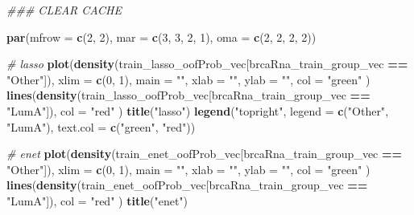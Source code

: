 \documentclass[
]{book}
\newenvironment{Shaded}{\begin{snugshade}}{\end{snugshade}}
\newcommand{\CommentTok}[1]{\textcolor[rgb]{0.56,0.35,0.01}{\textit{#1}}}
\newcommand{\DataTypeTok}[1]{\textcolor[rgb]{0.13,0.29,0.53}{#1}}
\newcommand{\DecValTok}[1]{\textcolor[rgb]{0.00,0.00,0.81}{#1}}
\newcommand{\KeywordTok}[1]{\textcolor[rgb]{0.13,0.29,0.53}{\textbf{#1}}}
\newcommand{\NormalTok}[1]{#1}
\newcommand{\OperatorTok}[1]{\textcolor[rgb]{0.81,0.36,0.00}{\textbf{#1}}}
\newcommand{\StringTok}[1]{\textcolor[rgb]{0.31,0.60,0.02}{#1}}
\begin{document}
\begin{Shaded}
\begin{Highlighting}[]
\CommentTok{\#\#\# CLEAR CACHE}

\KeywordTok{par}\NormalTok{(}\DataTypeTok{mfrow =} \KeywordTok{c}\NormalTok{(}\DecValTok{2}\NormalTok{, }\DecValTok{2}\NormalTok{), }\DataTypeTok{mar =} \KeywordTok{c}\NormalTok{(}\DecValTok{3}\NormalTok{, }\DecValTok{3}\NormalTok{, }\DecValTok{2}\NormalTok{, }\DecValTok{1}\NormalTok{), }\DataTypeTok{oma =} \KeywordTok{c}\NormalTok{(}\DecValTok{2}\NormalTok{, }\DecValTok{2}\NormalTok{, }\DecValTok{2}\NormalTok{, }\DecValTok{2}\NormalTok{))}

\CommentTok{\# lasso}
\KeywordTok{plot}\NormalTok{(}\KeywordTok{density}\NormalTok{(train\_lasso\_oofProb\_vec[brcaRna\_train\_group\_vec }\OperatorTok{==}\StringTok{ "Other"}\NormalTok{]),}
  \DataTypeTok{xlim =} \KeywordTok{c}\NormalTok{(}\DecValTok{0}\NormalTok{, }\DecValTok{1}\NormalTok{), }\DataTypeTok{main =} \StringTok{""}\NormalTok{, }\DataTypeTok{xlab =} \StringTok{""}\NormalTok{, }\DataTypeTok{ylab =} \StringTok{""}\NormalTok{, }\DataTypeTok{col =} \StringTok{"green"}
\NormalTok{)}
\KeywordTok{lines}\NormalTok{(}\KeywordTok{density}\NormalTok{(train\_lasso\_oofProb\_vec[brcaRna\_train\_group\_vec }\OperatorTok{==}\StringTok{ "LumA"}\NormalTok{]),}
  \DataTypeTok{col =} \StringTok{"red"}
\NormalTok{)}
\KeywordTok{title}\NormalTok{(}\StringTok{"lasso"}\NormalTok{)}
\KeywordTok{legend}\NormalTok{(}\StringTok{"topright"}\NormalTok{, }\DataTypeTok{legend =} \KeywordTok{c}\NormalTok{(}\StringTok{"Other"}\NormalTok{, }\StringTok{"LumA"}\NormalTok{), }\DataTypeTok{text.col =} \KeywordTok{c}\NormalTok{(}\StringTok{"green"}\NormalTok{, }\StringTok{"red"}\NormalTok{))}

\CommentTok{\# enet}
\KeywordTok{plot}\NormalTok{(}\KeywordTok{density}\NormalTok{(train\_enet\_oofProb\_vec[brcaRna\_train\_group\_vec }\OperatorTok{==}\StringTok{ "Other"}\NormalTok{]),}
  \DataTypeTok{xlim =} \KeywordTok{c}\NormalTok{(}\DecValTok{0}\NormalTok{, }\DecValTok{1}\NormalTok{), }\DataTypeTok{main =} \StringTok{""}\NormalTok{, }\DataTypeTok{xlab =} \StringTok{""}\NormalTok{, }\DataTypeTok{ylab =} \StringTok{""}\NormalTok{, }\DataTypeTok{col =} \StringTok{"green"}
\NormalTok{)}
\KeywordTok{lines}\NormalTok{(}\KeywordTok{density}\NormalTok{(train\_enet\_oofProb\_vec[brcaRna\_train\_group\_vec }\OperatorTok{==}\StringTok{ "LumA"}\NormalTok{]),}
  \DataTypeTok{col =} \StringTok{"red"}
\NormalTok{)}
\KeywordTok{title}\NormalTok{(}\StringTok{"enet"}\NormalTok{)}


\end{Highlighting}
\end{Shaded}
\end{document}
